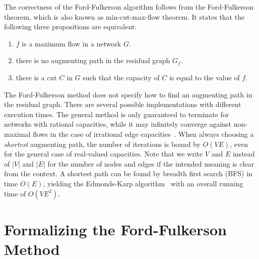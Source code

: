\documentclass[smallcondensed]{svjour3}     %
\newcommand{\isai}{\lstinline[language=isabelle,basicstyle=\normalsize\ttfamily\slshape]}
\begin{document}
The correctness of the Ford-Fulkerson algorithm follows from the Ford-Fulkerson theorem, which is also known as min-cut-max-flow theorem.
It states that the following three propositions are equivalent:
\begin{enumerate}
\item $f$ is a maximum flow in a network $G$.
\item there is no augmenting path in the residual graph $G_f$.
\item there is a cut $C$ in $G$ such that the capacity of $C$ is equal to the value of $f$.
\end{enumerate}

The Ford-Fulkerson method does not specify how to find an augmenting path in the residual graph. There are several possible implementations with different execution times. The general method is only guaranteed to terminate for networks with rational capacities, while it may infinitely converge against non-maximal flows in the case of irrational edge capacities~\cite{FF56,Zwick95}. When always choosing a \emph{shortest} augmenting path, the number of iterations is bound by $O(VE)$, even for the general case of real-valued capacities. Note that we write $V$ and $E$ instead of $|V|$ and $|E|$ for the number of nodes and edges if the intended meaning is clear from the context.
A shortest path can be found by breadth first search (BFS) in time $O(E)$, yielding the Edmonds-Karp algorithm~\cite{EK72} with an overall running time of $O(VE^2)$. 


\section{Formalizing the Ford-Fulkerson Method}\label{sec:abs-formalization}
%
%    
%      
%    
%    
\end{document}

